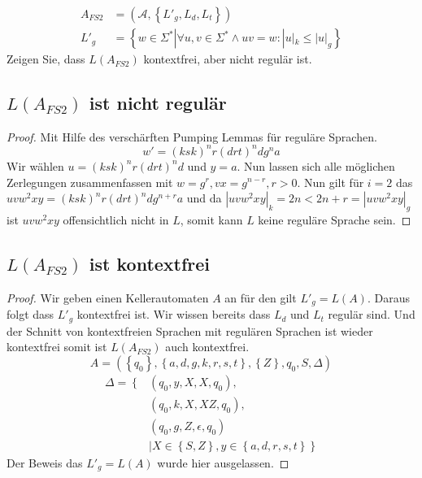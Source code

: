 \documentclass[]{article}
\begin{document}
\begin{align*}
A_{FS2}&=(\mathcal{A},\left\lbrace L'_g,L_d,L_t\right\rbrace )\\
L'_g&=\left\lbrace w\in\Sigma^*|\forall u,v\in\Sigma^* \wedge uv=w:|u|_k\leq|u|_g\right\rbrace \end{align*}
Zeigen Sie, dass $L(A_{FS2})$ kontextfrei, aber nicht regul\"ar ist.\\
\subsection{$L(A_{FS2})$ ist nicht regul\"ar}
\begin{proof}Mit Hilfe des versch\"arften Pumping Lemmas f\"ur regul\"are Sprachen.
$$w'=(ksk)^nr(drt)^ndg^na$$
Wir w\"ahlen $u=(ksk)^nr(drt)^nd$ und $y=a$. Nun lassen sich alle m\"oglichen Zerlegungen zusammenfassen mit $w=g^r,vx=g^{n-r},r>0$. Nun gilt f\"ur $i=2$ das $uvw^2xy=(ksk)^nr(drt)^ndg^{n+r}a$ und da $|uvw^2xy|_k=2n<2n+r=|uvw^2xy|_g$ ist $uvw^2xy$ offensichtlich nicht in $L$, somit kann $L$ keine regul\"are Sprache sein.
\end{proof}
\subsection{$L(A_{FS2})$ ist kontextfrei}
\begin{proof}
Wir geben einen Kellerautomaten $A$ an f\"ur den gilt $L'_g=L(A)$. Daraus folgt dass $L'_g$ kontextfrei ist. Wir wissen bereits dass $L_d$ und $L_t$ regul\"ar sind. Und der Schnitt von kontextfreien Sprachen mit regul\"aren Sprachen ist wieder kontextfrei somit ist $L(A_{FS2})$ auch kontextfrei.
$$A=(\left\lbrace q_0\right\rbrace ,\left\lbrace a,d,g,k,r,s,t\right\rbrace,\left\lbrace Z\right\rbrace ,q_0,S,\Delta )$$
\begin{align*}
\Delta =\left\lbrace\right.
&(q_0,y,X,X,q_0),\\
&(q_0,k,X,XZ,q_0),\\
&(q_0,g,Z,\epsilon,q_0)\\&|X\in\left\lbrace S,Z \right\rbrace,y\in\left\lbrace a,d,r,s,t\right\rbrace  \left. \right\rbrace 
\end{align*}
Der Beweis das $L'_g=L(A)$ wurde hier ausgelassen.
\end{proof}
\end{document}

